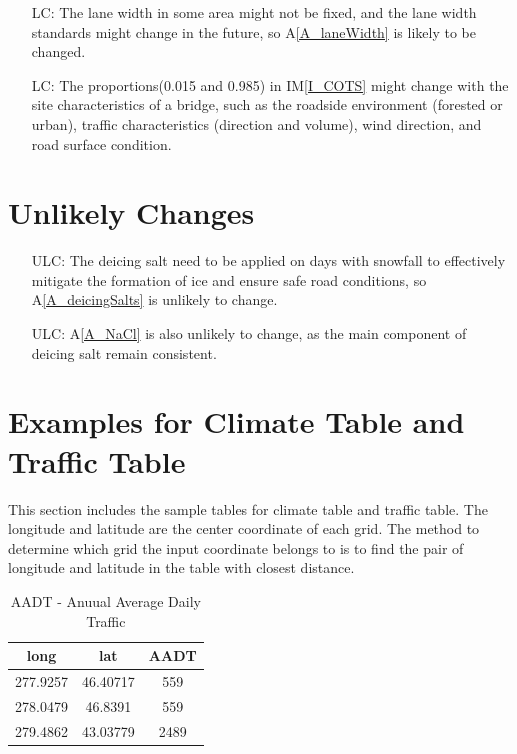 \documentclass[12pt]{article}
\newcommand{\aref}[1]{A\ref{#1}}
\newcommand{\iref}[1]{IM\ref{#1}}
\newcounter{lcnum} %
\newcounter{ulcnum} %
\begin{document}
\noindent \begin{itemize}

\item[LC\refstepcounter{lcnum}\thelcnum\label{LC_laneWidth}:] The lane width in some area might not be fixed, and the lane width standards might change in the future, so \aref{A_laneWidth} is likely to be changed. 
\item[LC\refstepcounter{lcnum}\thelcnum\label{LC_SASC}:] The proportions(0.015 and 0.985) in \iref{I_COTS} might change with the site characteristics of a bridge, such as the roadside environment (forested or urban), traffic characteristics (direction and volume), wind direction, and road surface condition. 

\end{itemize}

\section{Unlikely Changes}    

\noindent \begin{itemize}
\item[ULC\refstepcounter{ulcnum}\theulcnum\label{ULC_saltSame}:] The deicing salt need to be applied on days with snowfall to effectively mitigate the formation of ice and ensure safe road conditions, so \aref{A_deicingSalts} is unlikely to change.

\item[ULC\refstepcounter{ulcnum}\theulcnum\label{ULC_NaCl}:] \aref{A_NaCl} is also unlikely to change, as the main component of deicing salt remain consistent.


\end{itemize}

\section{Examples for Climate Table and Traffic Table}
This section includes the sample tables for climate table and traffic table. The longitude and latitude are the center coordinate of each grid. The method to determine which grid the input coordinate belongs to is to find the pair of longitude and latitude in the table with closest distance.

\begin{table}[H]
\centering
\begin{tabular}{|c|c|c|}
\hline 
 long & lat & AADT \\

\hline
277.9257 & 46.40717 & 559 \\ \hline
278.0479 & 46.8391 & 559 \\ \hline
279.4862 & 43.03779 & 2489  \\ \hline
\end{tabular}
\caption{AADT - Anuual Average Daily Traffic}
\label{Table:AADT}
\end{table}
\end{document}
